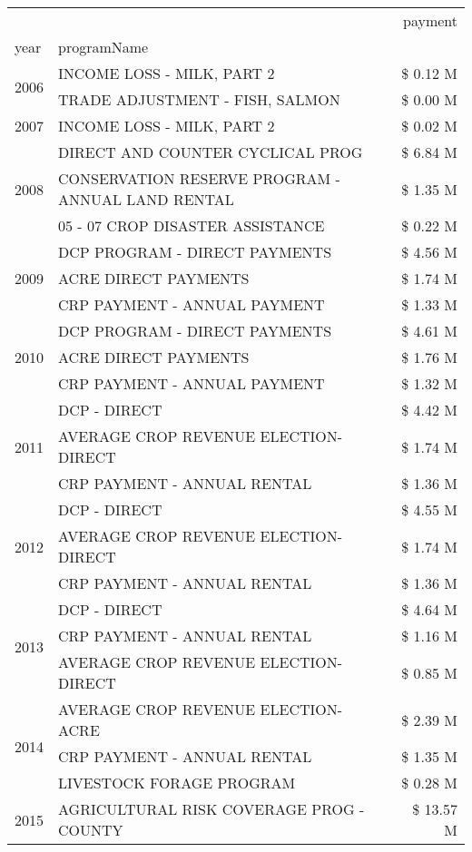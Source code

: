 \begin{tabular}{llr}
\toprule
 &  & payment \\
year & programName &  \\
\midrule
\multirow[t]{2}{*}{2006} & INCOME LOSS - MILK, PART 2 & \$ 0.12 M \\
 & TRADE ADJUSTMENT - FISH, SALMON & \$ 0.00 M \\
\cline{1-3}
2007 & INCOME LOSS - MILK, PART 2 & \$ 0.02 M \\
\cline{1-3}
\multirow[t]{3}{*}{2008} & DIRECT AND COUNTER CYCLICAL PROG & \$ 6.84 M \\
 & CONSERVATION RESERVE PROGRAM - ANNUAL LAND RENTAL & \$ 1.35 M \\
 & 05 - 07 CROP DISASTER ASSISTANCE & \$ 0.22 M \\
\cline{1-3}
\multirow[t]{3}{*}{2009} & DCP PROGRAM - DIRECT PAYMENTS & \$ 4.56 M \\
 & ACRE DIRECT PAYMENTS & \$ 1.74 M \\
 & CRP PAYMENT - ANNUAL PAYMENT & \$ 1.33 M \\
\cline{1-3}
\multirow[t]{3}{*}{2010} & DCP PROGRAM - DIRECT PAYMENTS & \$ 4.61 M \\
 & ACRE DIRECT PAYMENTS & \$ 1.76 M \\
 & CRP PAYMENT - ANNUAL PAYMENT & \$ 1.32 M \\
\cline{1-3}
\multirow[t]{3}{*}{2011} & DCP - DIRECT & \$ 4.42 M \\
 & AVERAGE CROP REVENUE ELECTION-DIRECT & \$ 1.74 M \\
 & CRP PAYMENT - ANNUAL RENTAL & \$ 1.36 M \\
\cline{1-3}
\multirow[t]{3}{*}{2012} & DCP - DIRECT & \$ 4.55 M \\
 & AVERAGE CROP REVENUE ELECTION-DIRECT & \$ 1.74 M \\
 & CRP PAYMENT - ANNUAL RENTAL & \$ 1.36 M \\
\cline{1-3}
\multirow[t]{3}{*}{2013} & DCP - DIRECT & \$ 4.64 M \\
 & CRP PAYMENT - ANNUAL RENTAL & \$ 1.16 M \\
 & AVERAGE CROP REVENUE ELECTION-DIRECT & \$ 0.85 M \\
\cline{1-3}
\multirow[t]{3}{*}{2014} & AVERAGE CROP REVENUE ELECTION-ACRE & \$ 2.39 M \\
 & CRP PAYMENT - ANNUAL RENTAL & \$ 1.35 M \\
 & LIVESTOCK FORAGE PROGRAM & \$ 0.28 M \\
\cline{1-3}
\multirow[t]{3}{*}{2015} & AGRICULTURAL RISK COVERAGE PROG - COUNTY & \$ 13.57 M \\

\end{tabular}
